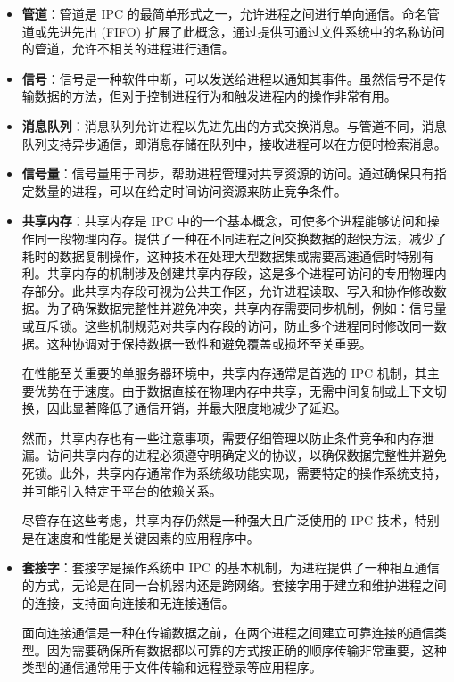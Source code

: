 \begin{itemize}
\item
\textbf{管道}：管道是 IPC 的最简单形式之一，允许进程之间进行单向通信。命名管道或先进先出 (FIFO) 扩展了此概念，通过提供可通过文件系统中的名称访问的管道，允许不相关的进程进行通信。

\item
\textbf{信号}：信号是一种软件中断，可以发送给进程以通知其事件。虽然信号不是传输数据的方法，但对于控制进程行为和触发进程内的操作非常有用。

\item
\textbf{消息队列}：消息队列允许进程以先进先出的方式交换消息。与管道不同，消息队列支持异步通信，即消息存储在队列中，接收进程可以在方便时检索消息。

\item
\textbf{信号量}：信号量用于同步，帮助进程管理对共享资源的访问。通过确保只有指定数量的进程，可以在给定时间访问资源来防止竞争条件。

\item
\textbf{共享内存}：共享内存是 IPC 中的一个基本概念，可使多个进程能够访问和操作同一段物理内存。提供了一种在不同进程之间交换数据的超快方法，减少了耗时的数据复制操作，这种技术在处理大型数据集或需要高速通信时特别有利。共享内存的机制涉及创建共享内存段，这是多个进程可访问的专用物理内存部分。此共享内存段可视为公共工作区，允许进程读取、写入和协作修改数据。为了确保数据完整性并避免冲突，共享内存需要同步机制，例如：信号量或互斥锁。这些机制规范对共享内存段的访问，防止多个进程同时修改同一数据。这种协调对于保持数据一致性和避免覆盖或损坏至关重要。

在性能至关重要的单服务器环境中，共享内存通常是首选的 IPC 机制，其主要优势在于速度。由于数据直接在物理内存中共享，无需中间复制或上下文切换，因此显著降低了通信开销，并最大限度地减少了延迟。

然而，共享内存也有一些注意事项，需要仔细管理以防止条件竞争和内存泄漏。访问共享内存的进程必须遵守明确定义的协议，以确保数据完整性并避免死锁。此外，共享内存通常作为系统级功能实现，需要特定的操作系统支持，并可能引入特定于平台的依赖关系。

尽管存在这些考虑，共享内存仍然是一种强大且广泛使用的 IPC 技术，特别是在速度和性能是关键因素的应用程序中。

\item
\textbf{套接字}：套接字是操作系统中 IPC 的基本机制，为进程提供了一种相互通信的方式，无论是在同一台机器内还是跨网络。套接字用于建立和维护进程之间的连接，支持面向连接和无连接通信。

面向连接通信是一种在传输数据之前，在两个进程之间建立可靠连接的通信类型。因为需要确保所有数据都以可靠的方式按正确的顺序传输非常重要，这种类型的通信通常用于文件传输和远程登录等应用程序。


\end{itemize}
